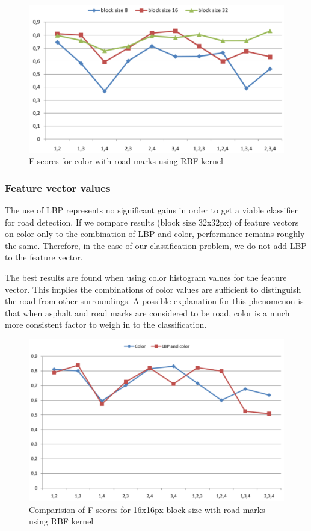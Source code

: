 \documentclass[runningheads,a4paper]{llncs}
\begin{document}
\begin{figure}
\centering
\includegraphics[width=\textwidth]{fig/RBF-COL-wi-RM.pdf}
\caption{F-scores for color with road marks using RBF kernel}
\label{fig:col-wi-rm}
\end{figure}

\subsubsection{Feature vector values}
The use of LBP represents no significant gains in order to get a viable classifier for road detection. If we compare results (block size 32x32px) of feature vectors on color only to the combination of LBP and color,  performance remains roughly the same.
Therefore, in the case of our classification problem, we do not add LBP to the feature vector.

The best results are found when using color histogram values for the feature vector. This implies the combinations of color values are sufficient to distinguish the road from other surroundings. A possible explanation for this phenomenon is that when asphalt and road marks are considered to be road, color is a much more consistent factor to weigh in to the classification.

\begin{figure}[h]
\centering
\includegraphics[width=\textwidth]{fig/16-wi-roadmarks.pdf}
\caption{Comparision of F-scores for 16x16px block size with road marks using RBF kernel }
\label{fig:16_wi_roadmarks}
\end{figure}
\end{document}
